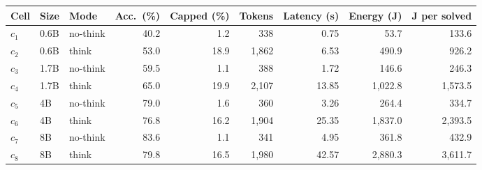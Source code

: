 \begin{tabular}{@{}lllrrrrrr@{}}
\toprule
Cell & Size & Mode & Acc.\ (\%) & Capped (\%) & Tokens & Latency (s) & Energy (J) & J per solved \\
\midrule
$c_1$ & 0.6B & no-think & 40.2 & 1.2 & 338 & 0.75 & 53.7 & 133.6 \\
$c_2$ & 0.6B & think & 53.0 & 18.9 & 1{,}862 & 6.53 & 490.9 & 926.2 \\
$c_3$ & 1.7B & no-think & 59.5 & 1.1 & 388 & 1.72 & 146.6 & 246.3 \\
$c_4$ & 1.7B & think & 65.0 & 19.9 & 2{,}107 & 13.85 & 1{,}022.8 & 1{,}573.5 \\
$c_5$ & 4B & no-think & 79.0 & 1.6 & 360 & 3.26 & 264.4 & 334.7 \\
$c_6$ & 4B & think & 76.8 & 16.2 & 1{,}904 & 25.35 & 1{,}837.0 & 2{,}393.5 \\
$c_7$ & 8B & no-think & 83.6 & 1.1 & 341 & 4.95 & 361.8 & 432.9 \\
$c_8$ & 8B & think & 79.8 & 16.5 & 1{,}980 & 42.57 & 2{,}880.3 & 3{,}611.7 \\
\bottomrule
\end{tabular}
